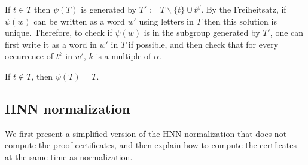 \documentclass[12pt]{article} %
\theoremstyle{definition}
\theoremstyle{definition}
\theoremstyle{definition}
\theoremstyle{definition}
\theoremstyle{definition}
\newtheorem{defn}[theorem]{Definition}
\theoremstyle{definition}
\begin{document}
If $t \in T$ then $\psi(T)$ is generated by
$T' := T \backslash \{t\} \cup t^\beta$. By the Freiheitsatz, if $\psi(w)$ can be written
as a word $w'$ using letters in $T$ then this solution is unique. Therefore,
to check if $\psi(w)$ is in the subgroup generated by $T'$, one can first
write it as a word in $w'$ in $T$ if possible, and then check that for every
occurrence of $t^k$ in $w'$, $k$ is a multiple of $\alpha$.

If $t \notin T$, then  $\psi(T) = T$.







\subsection{HNN normalization}\label{HNNnorm}

We first present a simplified version of the HNN normalization that does not compute
the proof certificates, and then explain how to compute the certficates at the
same time as normalization.
\end{document}
